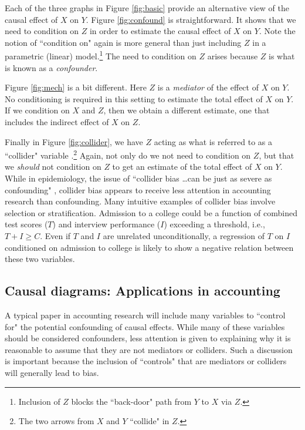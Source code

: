 \documentclass[12pt,reqno,titlepage]{amsart}
\theoremstyle{definition}
\begin{document}
\begin{doublespace}
Each of the three graphs in Figure \ref{fig:basic} provide an alternative view of the causal effect of $X$ on $Y$.	
Figure \ref{fig:confound} is straightforward. 
It shows that we need to condition on $Z$ in order to estimate the causal effect of $X$ on $Y$.
Note the notion of ``condition on" again is more general than just including $Z$ in a parametric (linear) model.\footnote{
Inclusion of $Z$ blocks the ``back-door" path from $Y$ to $X$ via $Z$.} The need to condition on $Z$ arises because $Z$ is what is known as a \emph{confounder}.

Figure \ref{fig:mech} is a bit different. Here $Z$ is a \emph{mediator} of the effect of $X$ on $Y$.
No conditioning is required in this setting to estimate the total effect of $X$ on $Y$. If we condition on $X$ and $Z$, then we 
obtain a different estimate, one that includes the indirect effect of $X$ on $Z$.

Finally in Figure \ref{fig:collider}, we have $Z$ acting as what is referred to as a ``collider" variable \citep{Glymour:2008aa,Pearl:2009kh}.\footnote{
The two arrows from $X$ and $Y$ ``collide" in $Z$.} 
Again, not only do we not need to condition on $Z$, but that we \emph{should} not condition on $Z$ to get an estimate of the total effect of $X$ on $Y$.
While in epidemiology, the issue of ``collider bias \dots can be just as severe as confounding" \citep[p.\,186]{Glymour:2008aa}, collider bias appears to receive less attention in accounting research than confounding.
Many intuitive examples of collider bias involve selection or stratification.
Admission to a college could be a function of combined test scores 
($T$) and interview performance ($I$) exceeding a threshold, i.e., $T + I \geq C$. 
Even if $T$ and $I$ are unrelated unconditionally, a regression of $T$ on $I$ conditioned on admission to college is likely to show a negative relation between these two variables.

\subsection{Causal diagrams: Applications in accounting}
A typical paper in accounting research will include many variables  to ``control for" the potential confounding of causal effects.
While many of these variables should be considered confounders, less attention is given to explaining why it is reasonable to assume that they are not mediators or colliders.
Such a discussion is important because the inclusion of ``controls" that are mediators or colliders will generally lead to bias.


\end{doublespace}
\end{document}
